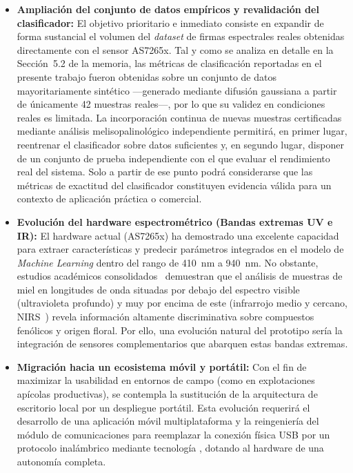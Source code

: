 \begin{itemize}
    \item \textbf{Ampliación del conjunto de datos empíricos y revalidación del clasificador:} El objetivo prioritario e inmediato consiste en expandir de forma sustancial el volumen del \textit{dataset} de firmas espectrales reales obtenidas directamente con el sensor AS7265x. Tal y como se analiza en detalle en la Sección~5.2 de la memoria, las métricas de clasificación reportadas en el presente
    trabajo fueron obtenidas sobre un conjunto de datos mayoritariamente sintético ---generado mediante difusión gaussiana a partir de únicamente 42 muestras reales---, por lo que su validez  en condiciones  reales es limitada. La incorporación continua de nuevas muestras certificadas mediante análisis melisopalinológico independiente permitirá, en primer lugar, reentrenar el clasificador sobre datos  suficientes y, en segundo lugar, disponer de un conjunto de prueba independiente con el que evaluar el rendimiento real del sistema. Solo a partir de ese punto podrá considerarse que las métricas de exactitud del clasificador constituyen evidencia  válida para un contexto de aplicación práctica o comercial.
    
    \item \textbf{Evolución del hardware espectrométrico (Bandas extremas UV e IR):} El hardware actual (AS7265x) ha demostrado una excelente capacidad para extraer características y predecir parámetros integrados en el modelo de \textit{Machine Learning} dentro del rango de 410~nm a 940~nm. No obstante, estudios académicos consolidados~\cite{sciencedirect_espectro_miel} demuestran que el análisis de muestras de miel en longitudes de onda situadas por debajo del espectro visible (ultravioleta profundo) y muy por encima de este (infrarrojo medio y cercano, NIRS~\cite{guillen2017nirs}) revela información altamente discriminativa sobre compuestos fenólicos y origen floral. Por ello, una evolución natural del prototipo sería la integración de sensores complementarios que abarquen estas bandas extremas.
    
    \item \textbf{Migración hacia un ecosistema móvil y portátil:} Con el fin de maximizar la usabilidad en entornos de campo (como en explotaciones apícolas productivas), se contempla la sustitución de la arquitectura de escritorio local por un despliegue portátil. Esta evolución requerirá el desarrollo de una aplicación móvil multiplataforma y la reingeniería del módulo de comunicaciones para reemplazar la conexión física USB por un protocolo inalámbrico mediante tecnología , dotando al hardware de una autonomía completa.
\end{itemize}
